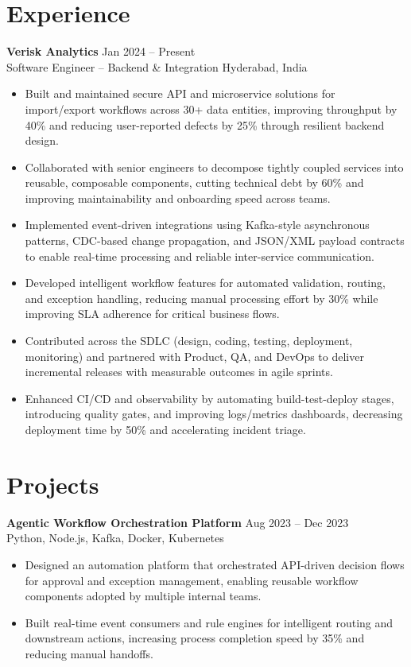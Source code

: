 \documentclass[10pt,letterpaper]{article}
\newcommand{\resumeSubheading}[4]{%
  \textbf{#1} \hfill #2 \\
  #3 \hfill #4 \\
}
\begin{document}
\section*{Experience}
\resumeSubheading{Verisk Analytics}{Jan 2024 -- Present}{Software Engineer -- Backend \& Integration}{Hyderabad, India}
\begin{itemize}
    \item Built and maintained secure API and microservice solutions for import/export workflows across 30+ data entities, improving throughput by 40\% and reducing user-reported defects by 25\% through resilient backend design.
    \item Collaborated with senior engineers to decompose tightly coupled services into reusable, composable components, cutting technical debt by 60\% and improving maintainability and onboarding speed across teams.
    \item Implemented event-driven integrations using Kafka-style asynchronous patterns, CDC-based change propagation, and JSON/XML payload contracts to enable real-time processing and reliable inter-service communication.
    \item Developed intelligent workflow features for automated validation, routing, and exception handling, reducing manual processing effort by 30\% while improving SLA adherence for critical business flows.
    \item Contributed across the SDLC (design, coding, testing, deployment, monitoring) and partnered with Product, QA, and DevOps to deliver incremental releases with measurable outcomes in agile sprints.
    \item Enhanced CI/CD and observability by automating build-test-deploy stages, introducing quality gates, and improving logs/metrics dashboards, decreasing deployment time by 50\% and accelerating incident triage.
\end{itemize}

\section*{Projects}
\resumeSubheading{Agentic Workflow Orchestration Platform}{Aug 2023 -- Dec 2023}{}{Python, Node.js, Kafka, Docker, Kubernetes}
\begin{itemize}
    \item Designed an automation platform that orchestrated API-driven decision flows for approval and exception management, enabling reusable workflow components adopted by multiple internal teams.
    \item Built real-time event consumers and rule engines for intelligent routing and downstream actions, increasing process completion speed by 35\% and reducing manual handoffs.
\end{itemize}
\end{document}
